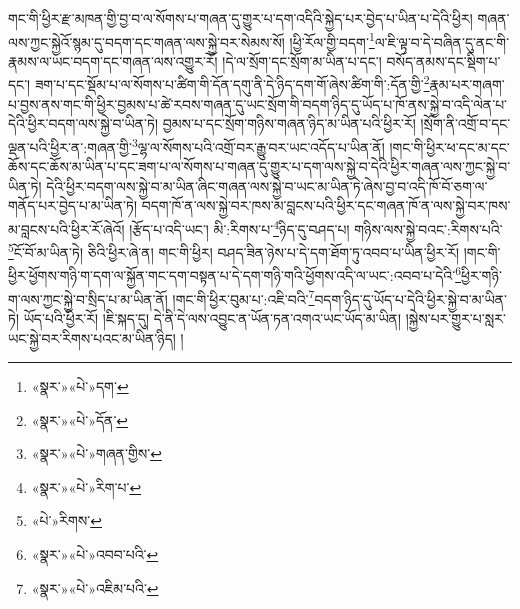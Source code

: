 གང་གི་ཕྱིར་རྫ་མཁན་གྱི་བྱ་བ་ལ་སོགས་པ་གཞན་དུ་གྱུར་པ་དག་འདིའི་སྐྱེད་པར་བྱེད་པ་ཡིན་པ་དེའི་ཕྱིར། གཞན་ལས་ཀྱང་སྐྱེའོ་སྙམ་དུ་བདག་དང་གཞན་ལས་སྐྱེ་བར་སེམས་སོ། །ཕྱི་རོལ་གྱི་བདག་\footnote{«སྣར་»«པེ་»དག་}ལ་ཇི་ལྟ་བ་དེ་བཞིན་དུ་ནང་གི་རྣམས་ལ་ཡང་བདག་དང་གཞན་ལས་འགྱུར་རོ། །དེ་ལ་སྲོག་དང་སྲོག་མ་ཡིན་པ་དང་། བསོད་ནམས་དང་སྡིག་པ་དང་། ཟག་པ་དང་སྡོམ་པ་ལ་སོགས་པ་ཚིག་གི་དོན་དགུ་ནི་དེ་ཉིད་དག་གོ་ཞེས་ཚིག་གི་:དོན་གྱི་\footnote{«སྣར་»«པེ་»དོན་}རྣམ་པར་གཞག་པ་བྱས་ནས་གང་གི་ཕྱིར་བྱམས་པ་ཚེ་རབས་གཞན་དུ་ཡང་སྲོག་གི་བདག་ཉིད་དུ་ཡོད་པ་ཁོ་ནས་སྐྱེ་བ་འདི་ལེན་པ་དེའི་ཕྱིར་བདག་ལས་སྐྱེ་བ་ཡིན་ཏེ། བྱམས་པ་དང་སྲོག་གཉིས་གཞན་ཉིད་མ་ཡིན་པའི་ཕྱིར་རོ། །སྲོག་ནི་འགྲོ་བ་དང་ལྡན་པའི་ཕྱིར་ན་:གཞན་གྱི་\footnote{«སྣར་»«པེ་»གཞན་གྱིས་}ལྷ་ལ་སོགས་པའི་འགྲོ་བར་རྒྱུ་བར་ཡང་འདོད་པ་ཡིན་ནོ། །གང་གི་ཕྱིར་ཕ་དང་མ་དང་ཆོས་དང་ཆོས་མ་ཡིན་པ་དང་ཟག་པ་ལ་སོགས་པ་གཞན་དུ་གྱུར་པ་དག་ལས་སྐྱེ་བ་དེའི་ཕྱིར་གཞན་ལས་ཀྱང་སྐྱེ་བ་ཡིན་ཏེ། དེའི་ཕྱིར་བདག་ལས་སྐྱེ་བ་མ་ཡིན་ཞིང་གཞན་ལས་སྐྱེ་བ་ཡང་མ་ཡིན་ཏེ་ཞེས་བྱ་བ་འདི་ཁོ་བོ་ཅག་ལ་གནོད་པར་བྱེད་པ་མ་ཡིན་ཏེ། བདག་ཁོ་ན་ལས་སྐྱེ་བར་ཁས་མ་བླངས་པའི་ཕྱིར་དང་གཞན་ཁོ་ན་ལས་སྐྱེ་བར་ཁས་མ་བླངས་པའི་ཕྱིར་རོ་ཞེའོ། །རྩོད་པ་འདི་ཡང་། མི་:རིགས་པ་\footnote{«སྣར་»«པེ་»རིག་པ་}ཉིད་དུ་བཤད་པ། གཉིས་ལས་སྐྱེ་བའང་:རིགས་པའི་\footnote{«པེ་»རིགས་}ངོ་བོ་མ་ཡིན་ཏེ། ཅིའི་ཕྱིར་ཞེ་ན། གང་གི་ཕྱིར། བཤད་ཟིན་ཉེས་པ་དེ་དག་ཐོག་ཏུ་འབབ་པ་ཡིན་ཕྱིར་རོ། །གང་གི་ཕྱིར་ཕྱོགས་གཉི་ག་དག་ལ་སྐྱོན་གང་དག་བསྟན་པ་དེ་དག་གཉི་གའི་ཕྱོགས་འདི་ལ་ཡང་:འབབ་པ་དེའི་\footnote{«སྣར་»«པེ་»འབབ་པའི་}ཕྱིར་གཉི་ག་ལས་ཀྱང་སྐྱེ་བ་སྲིད་པ་མ་ཡིན་ནོ། །གང་གི་ཕྱིར་བུམ་པ་:འཇི་བའི་\footnote{«སྣར་»«པེ་»འཇིམ་པའི་}བདག་ཉིད་དུ་ཡོད་པ་དེའི་ཕྱིར་སྐྱེ་བ་མ་ཡིན་ཏེ། ཡོད་པའི་ཕྱིར་རོ། །ཇི་སྐད་དུ། དེ་ནི་དེ་ལས་འབྱུང་ན་ཡོན་ཏན་འགའ་ཡང་ཡོད་མ་ཡིན། །སྐྱེས་པར་གྱུར་པ་སླར་ཡང་སྐྱེ་བར་རིགས་པའང་མ་ཡིན་ཉིད། །
